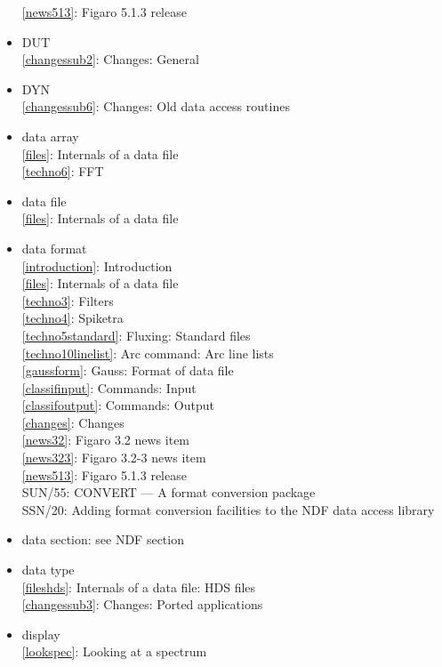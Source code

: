 \documentclass[11pt,twoside]{article}
\newcommand{\htmlref}[2]{#1}
\newcommand{\xref}[3]{#1}
\newcommand{\idxint}[2]{\ref{#1}: \htmlref{#2}{#1}}
\newcommand{\idxint}[2]{\htmlref{#2}{#1}}
\newcommand{\latorhtm}[2]{#1}
\newcommand{\latorhtm}[2]{#2}
\begin{document}
\begin{itemize}
   \idxint{news513}{Figaro 5.1.3 release}
\item DUT\\
   \idxint{changessub2}{Changes: General}
\item DYN\\
   \idxint{changessub6}{Changes: Old data access routines}
\item data array\\
   \idxint{files}{Internals of a data file}\\
   \idxint{techno6}{FFT}
\item data file\\
   \idxint{files}{Internals of a data file}
\item data format\\
   \idxint{introduction}{Introduction}\\
   \idxint{files}{Internals of a data file}\\
   \idxint{techno3}{Filters}\\
   \idxint{techno4}{Spiketra}\\
   \idxint{techno5standard}{Fluxing: Standard files}\\
   \idxint{techno10linelist}{Arc command: Arc line lists}\\
   \idxint{gaussform}{Gauss: Format of data file}\\
   \idxint{classifinput}{Commands: Input}\\
   \idxint{classifoutput}{Commands: Output}\\
   \idxint{changes}{Changes}\\
   \idxint{news32}{Figaro 3.2 news item}\\
   \idxint{news323}{Figaro 3.2-3 news item}\\
   \idxint{news513}{Figaro 5.1.3 release}\\
   \xref{SUN/55: CONVERT \latorhtm{---}{-} A format conversion package}{sun55}{}\\
   \xref{SSN/20: Adding format conversion facilities to the NDF data
      access library}{ssn20}{}
\item data section: see NDF section
\item data type\\
   \idxint{fileshds}{Internals of a data file: HDS files}\\
   \idxint{changessub3}{Changes: Ported applications}
\item display\\
   \idxint{lookspec}{Looking at a spectrum}\\

\end{itemize}
\end{document}
